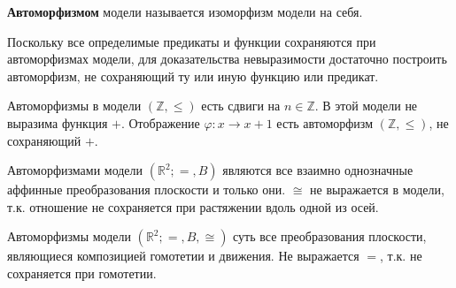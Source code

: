 \begin{definition}
	\textbf{Автоморфизмом} модели называется изоморфизм модели на себя.
\end{definition}


Поскольку все определимые предикаты и функции сохраняются при автоморфизмах модели, для доказательства
невыразимости достаточно построить автоморфизм, не сохраняющий ту или иную функцию или предикат.

\begin{example}
Автоморфизмы в модели $(\mathbb{Z}, \leqslant)$ есть сдвиги на $n \in \mathbb{Z}$. В этой модели не выразима
	функция $+$. Отображение $\varphi: x \rightarrow x+1$ есть автоморфизм $(\mathbb{Z}, \leqslant)$, не
	сохраняющий $+$.
\end{example}

\begin{example}
Автоморфизмами модели $\left(\mathbb{R}^{2} ;=, B \right)$ являются все взаимно однозначные аффинные преобразования
	плоскости и только они. $\cong$ не выражается в модели, т.к. отношение не сохраняется при растяжении вдоль
	одной из осей.
\end{example}

\begin{example}
 Автоморфизмы модели $\left(\mathbb{R}^{2} ;=, B, \cong\right)$ суть все преобразования плоскости, являющиеся
	композицией гомотетии и движения. Не выражается $=$, т.к. не сохраняется при гомотетии.
\end{example}
